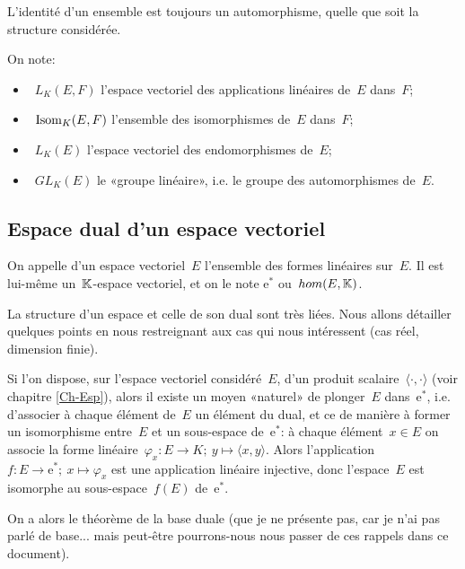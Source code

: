 \medskip
L'identité d'un ensemble est toujours un automorphisme, quelle que soit la structure considérée.

\medskip
On note:
\begin{itemize}
  \item~$L_K(E,F)$ l'espace vectoriel des applications linéaires de~$E$ dans~$F$;
  \item~$\operatorname{Isom}_K(E,F)$ l'ensemble des isomorphismes de~$E$ dans~$F$;
  \item~$L_K(E)$ l'espace vectoriel des endomorphismes de~$E$;
  \item~$GL_K(E)$ le «groupe linéaire», i.e. le groupe des automorphismes de~$E$.
\end{itemize}

\medskip
\subsection{Espace dual d'un espace vectoriel}

\begin{definition}
On appelle  d'un espace vectoriel~$E$ l'ensemble des formes linéaires sur~$E$. Il est lui-même un~$\mathbb K$-espace vectoriel, et on le note $\mathrm{e}^*$ ou~$hom(E,\mathbb K)$.
\end{definition}

La structure d'un espace et celle de son dual sont très liées.
Nous allons détailler quelques points en nous restreignant aux cas qui nous intéressent (cas réel, dimension finie).

\medskip
{}
Si l'on dispose, sur l'espace vectoriel considéré~$E$, d'un produit scalaire~$\langle\cdot,\cdot\rangle$ (voir chapitre \ref{Ch-Esp}), alors il existe un moyen «naturel» de plonger~$E$ dans~$\mathrm{e}^*$, i.e. d'associer à chaque élément de~$E$ un élément du dual, et ce de manière à former un isomorphisme entre~$E$ et un sous-espace de~$\mathrm{e}^*$:
à chaque élément~$x\in E$ on associe la forme linéaire~$\varphi_x: E \to K;\ y \mapsto \langle x,y\rangle$.
Alors l'application~$f: E \to \mathrm{e}^*;\ x \mapsto \varphi_x$ est une application linéaire injective, donc l'espace~$E$ est isomorphe au sous-espace~$f(E)$ de~$\mathrm{e}^*$.

\medskip
{}
On a alors le théorème de la base duale (que je ne présente pas, car je n'ai pas parlé de base... mais peut-être pourrons-nous nous passer de ces rappels dans ce document).

